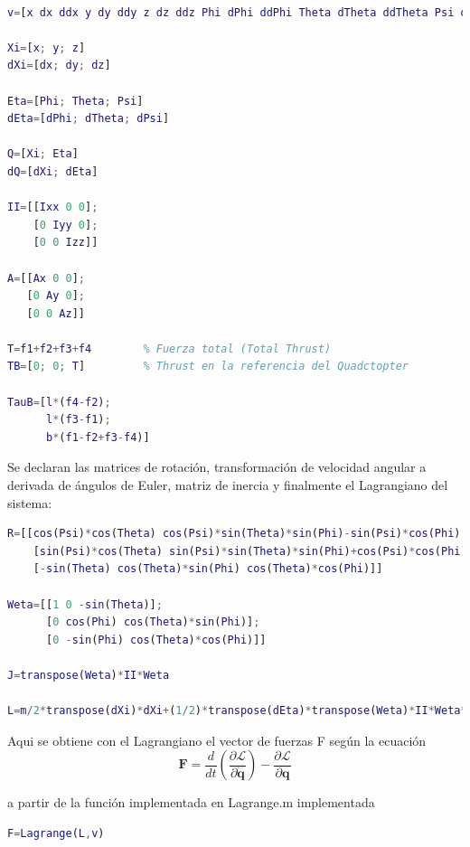 \documentclass[twoside,11pt]{book}
\begin{document}
\begin{lstlisting}[language=Matlab,firstnumber=18]
% El vector de variables que se usaran

v=[x dx ddx y dy ddy z dz ddz Phi dPhi ddPhi Theta dTheta ddTheta Psi dPsi ddPsi]

Xi=[x; y; z]
dXi=[dx; dy; dz]

Eta=[Phi; Theta; Psi]
dEta=[dPhi; dTheta; dPsi]

Q=[Xi; Eta]
dQ=[dXi; dEta]

II=[[Ixx 0 0];
    [0 Iyy 0];
    [0 0 Izz]]

A=[[Ax 0 0];
   [0 Ay 0];
   [0 0 Az]]   
   
T=f1+f2+f3+f4        % Fuerza total (Total Thrust)
TB=[0; 0; T]         % Thrust en la referencia del Quadctopter

TauB=[l*(f4-f2);
      l*(f3-f1);
      b*(f1-f2+f3-f4)]   
\end{lstlisting}
\onehalfspacing
Se declaran las matrices de rotación, transformación de velocidad angular a derivada de ángulos de Euler, matriz de inercia y finalmente el Lagrangiano del sistema:
\singlespacing
\begin{lstlisting}[language=Matlab,firstnumber=45]
R=[[cos(Psi)*cos(Theta) cos(Psi)*sin(Theta)*sin(Phi)-sin(Psi)*cos(Phi) cos(Psi)*sin(Theta)*cos(Phi)+sin(Psi)*sin(Phi)];
    [sin(Psi)*cos(Theta) sin(Psi)*sin(Theta)*sin(Phi)+cos(Psi)*cos(Phi) sin(Psi)*sin(Theta)*cos(Phi)-cos(Psi)*sin(Phi)];
    [-sin(Theta) cos(Theta)*sin(Phi) cos(Theta)*cos(Phi)]]

Weta=[[1 0 -sin(Theta)];
      [0 cos(Phi) cos(Theta)*sin(Phi)];
      [0 -sin(Phi) cos(Theta)*cos(Phi)]]
  
J=transpose(Weta)*II*Weta  
  
L=m/2*transpose(dXi)*dXi+(1/2)*transpose(dEta)*transpose(Weta)*II*Weta*dEta-m*g*z
\end{lstlisting}
\onehalfspacing
Aqui se obtiene con el Lagrangiano el vector de fuerzas F según la ecuación 
\begin{equation}
\mathbf{F}=\frac{d}{dt}\left( \frac{\partial \mathcal{L}}{\partial \dot{\pmb{q}}} \right) - \frac{\partial \mathcal{L}}{\partial \pmb{q}}
\end{equation}

a partir de la función implementada en Lagrange.m implementada \cite{Lagrangian_Matlab} \\

\begin{lstlisting}[language=Matlab,firstnumber=56]
F=Lagrange(L,v)
\end{lstlisting}
\end{document}

